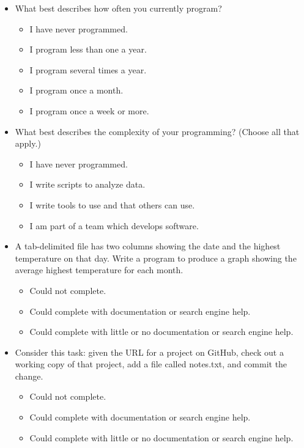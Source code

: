 \documentclass[10pt,a4paper,twocolumn]{article}
\begin{document}
\begin{itemize}
\item
  What best describes how often you currently program?
  \begin{itemize}[noitemsep]
    \item I have never programmed.
    \item I program less than one a year.
    \item I program several times a year.
    \item I program once a month.
    \item I program once a week or more.
  \end{itemize}

\item
  What best describes the complexity of your programming? (Choose all
  that apply.)
  \begin{itemize}[noitemsep]
    \item I have never programmed.
    \item I write scripts to analyze data.
    \item I write tools to use and that others can use.
    \item I am part of a team which develops software.
  \end{itemize}

  \item
    A tab-delimited file has two columns showing the date and the
    highest temperature on that day. Write a program to produce a
    graph showing the average highest temperature for each month.
    \begin{itemize}[noitemsep]
    \item Could not complete.
    \item Could complete with documentation or search engine help.
    \item Could complete with little or no documentation or search engine help.
    \end{itemize}

  \item
    Consider this task: given the URL for a project on GitHub, check
    out a working copy of that project, add a file called notes.txt,
    and commit the change.
    \begin{itemize}[noitemsep]
    \item Could not complete.
    \item Could complete with documentation or search engine help.
    \item Could complete with little or no documentation or search engine help.
    \end{itemize}


\end{itemize}
\end{document}
